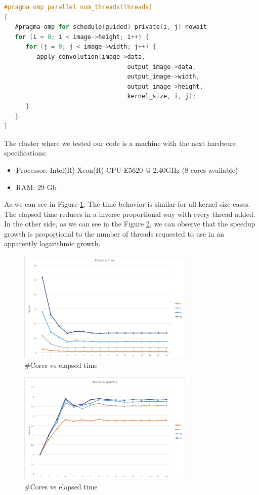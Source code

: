 \documentclass{article}
\begin{document}
	\begin{lstlisting}[language=C,frame=single,caption={Fragment of code where the paralelization is applied},label=lst:omp_code]
#pragma omp parallel num_threads(threads)
{
   #pragma omp for schedule(guided) private(i, j) nowait
   for (i = 0; i < image->height; i++) {
      for (j = 0; j < image->width; j++) {
         apply_convolution(image->data,
                                  output_image->data,
                                  output_image->width,
                                  output_image->height,
                                  kernel_size, i, j);
      }
   }
}
	\end{lstlisting}
	
	The cluster where we tested our code is a machine with the next hardware specifications:
	\begin{itemize}
		\item Processor: Intel(R) Xeon(R) CPU E5620  @ 2.40GHz (8 cores available)
		\item RAM: 29 Gb
	\end{itemize}

	As we can see in Figure \ref{fig:core_time}. The time behavior is similar for all kernel size cases. The elapsed time reduces in a inverse proportional way with every thread added. In the other side, as we can see in the Figure \ref{fig:core_speedup}, we can observe that the speedup growth is proportional to the number of threads requested to use in an apparently logarithmic growth.
	
	\begin{figure}[ht]
		\centering
		\includegraphics[width=0.75\textwidth]{core_time}
		\caption{\#Cores vs elapsed time}
		\label{fig:core_time}
	\end{figure}

	\begin{figure}[ht]
		\centering
		\includegraphics[width=0.75\textwidth]{core_speedup}
		\caption{\#Cores vs elapsed time}
		\label{fig:core_speedup}
	\end{figure}
	
\end{document}
